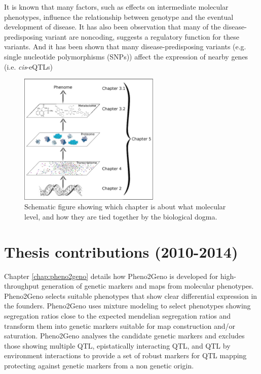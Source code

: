 It is known that many factors, such as effects on intermediate molecular phenotypes, influence 
the relationship between genotype and the eventual development of disease. It has also been 
observation that many of the disease-predisposing variant are noncoding, suggests a regulatory 
function for these variants. And it has been shown that many disease-predisposing variants 
(e.g. single nucleotide polymorphisms (SNPs)) affect the expression of nearby genes (i.e. 
\emph{cis}-eQTLs)\cite{Powell:2012, Lude:2011, Zeller:2010}

\begin{figure}[h!]
 \centering
    \includegraphics[width=0.6\textwidth]{eps/image_1_3}
  \caption[ThesisLayout.]
    {Schematic figure showing which chapter is about what molecular level, and how they are tied together by the biological dogma.}
    \label{fig:layout}
\end{figure}

\section{Thesis contributions (2010-2014)}
Chapter \ref{chap:pheno2geno} details how Pheno2Geno is developed for high-throughput generation of genetic markers and maps from 
molecular phenotypes. Pheno2Geno selects suitable phenotypes that show clear differential expression 
in the founders. Pheno2Geno uses mixture modeling to select phenotypes showing segregation ratios 
close to the expected mendelian segregation ratios and transform them into genetic markers suitable 
for map construction and/or saturation. Pheno2Geno analyses the candidate genetic markers and excludes 
those showing multiple QTL, epistatically interacting QTL, and QTL by environment interactions to 
provide a set of robust markers for QTL mapping protecting against genetic markers from a non genetic 
origin.

